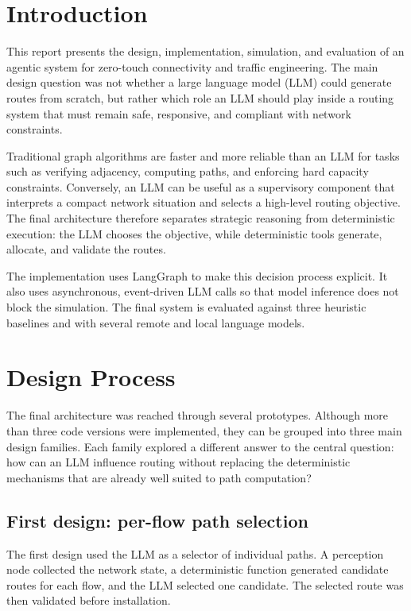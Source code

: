 \section*{Introduction}

This report presents the design, implementation, simulation, and evaluation of an
agentic system for zero-touch connectivity and traffic engineering. The main design
question was not whether a large language model (LLM) could generate routes from
scratch, but rather which role an LLM should play inside a routing system that must
remain safe, responsive, and compliant with network constraints.

Traditional graph algorithms are faster and more reliable than an LLM for tasks such
as verifying adjacency, computing paths, and enforcing hard capacity constraints.
Conversely, an LLM can be useful as a supervisory component that interprets a compact
network situation and selects a high-level routing objective. The final architecture
therefore separates strategic reasoning from deterministic execution: the LLM chooses
the objective, while deterministic tools generate, allocate, and validate the routes.

The implementation uses LangGraph to make this decision process explicit. It also
uses asynchronous, event-driven LLM calls so that model inference does not block the
simulation. The final system is evaluated against three heuristic baselines and with
several remote and local language models.


\section{Design Process}

The final architecture was reached through several prototypes. Although more than
three code versions were implemented, they can be grouped into three main design
families. Each family explored a different answer to the central question: how can an
LLM influence routing without replacing the deterministic mechanisms that are already
well suited to path computation?

\subsection{First design: per-flow path selection}

The first design used the LLM as a selector of individual paths. A perception node
collected the network state, a deterministic function generated candidate routes for
each flow, and the LLM selected one candidate. The selected route was then validated
before installation.

